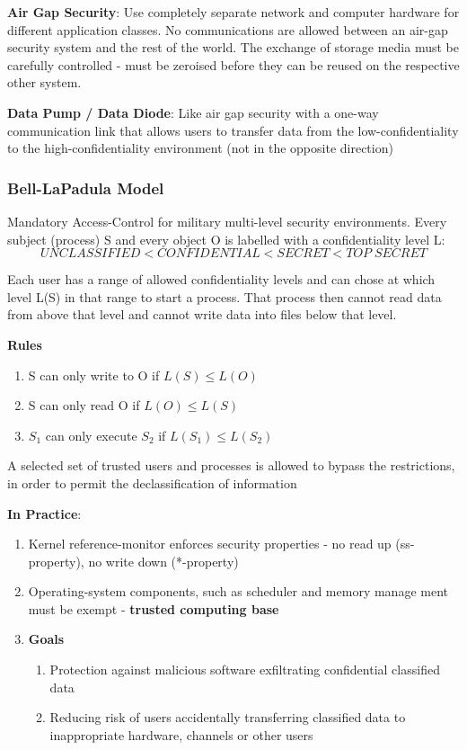 \documentclass{article}
\newenvironment{example}{\par\color{brown}}{\par}
\begin{document}
\begin{example}
	\noindent
	\textbf{Air Gap Security}: Use completely separate network and computer hardware for different application classes. No communications are allowed between an air-gap security system and the rest of the world. The exchange of storage media must be carefully controlled - must be zeroised before they can be reused on the respective other system.
	
	\bigskip
	\noindent
	\textbf{Data Pump / Data Diode}: Like air gap security with a one-way communication link that allows users to transfer data from the low-confidentiality to the high-confidentiality environment (not in the opposite direction)
\end{example}

\subsubsection{Bell-LaPadula Model}
Mandatory Access-Control for military multi-level security environments. Every subject (process) S and every object O is labelled with a confidentiality level L:
$$UNCLASSIFIED < CONFIDENTIAL < SECRET < TOP \; SECRET$$

Each user has a range of allowed confidentiality levels and can chose at which level L(S) in that range to start a process. That process then cannot read data from above that level and cannot write data into files below that level. 

\noindent
\textbf{Rules}
\begin{enumerate}
	\item S can only write to O if $L(S) \leq L(O)$
	\item S can only read O if $L(O) \leq L(S)$
	\item $S_{1}$ can only execute $S_{2}$ if $L(S_{1}) \leq L(S_{2})$
\end{enumerate}

A selected set of trusted users and processes is allowed to bypass the restrictions, in order to permit the declassification of information

\bigskip
\noindent
\textbf{In Practice}:
\begin{enumerate}
	\item Kernel reference-monitor enforces security properties - no read up (ss-property), no write down (*-property)
	\item Operating-system components, such as scheduler and memory manage
	ment must be exempt - \textbf{trusted computing base}
	\item \textbf{Goals}
	\begin{enumerate}
		\item Protection against malicious software exfiltrating confidential classified data
		\item Reducing risk of users accidentally transferring classified data to inappropriate hardware, channels or other users
	\end{enumerate}
\end{enumerate}
\end{document}
